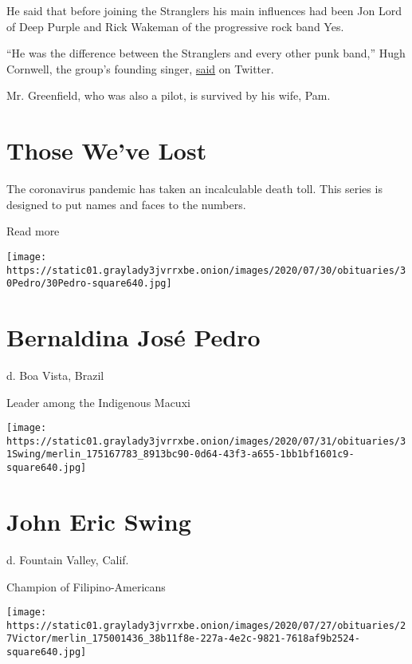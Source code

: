 He said that before joining the Stranglers his main influences had been
Jon Lord of Deep Purple and Rick Wakeman of the progressive rock band
Yes.

``He was the difference between the Stranglers and every other punk
band,'' Hugh Cornwell, the group's founding singer,
\href{https://twitter.com/HughCornwell/status/1257349295742779392?s=20}{said}
on Twitter.

Mr. Greenfield, who was also a pilot, is survived by his wife, Pam.

\href{https://www.nytimes3xbfgragh.onion/interactive/2020/obituaries/people-died-coronavirus-obituaries.html?action=click\&pgtype=Article\&state=default\&region=BELOW_MAIN_CONTENT\&context=covid_obits_promo}{}

\hypertarget{those-weve-lost}{%
\section{Those We've Lost}\label{those-weve-lost}}

The coronavirus pandemic has taken an incalculable death toll. This
series is designed to put names and faces to the numbers.

Read more

\texttt{[image: https://static01.graylady3jvrrxbe.onion/images/2020/07/30/obituaries/30Pedro/30Pedro-square640.jpg]}

\hypertarget{bernaldina-josuxe9-pedro}{%
\section{Bernaldina José Pedro}\label{bernaldina-josuxe9-pedro}}

d. Boa Vista, Brazil

Leader among the Indigenous Macuxi

\texttt{[image: https://static01.graylady3jvrrxbe.onion/images/2020/07/31/obituaries/31Swing/merlin\_175167783\_8913bc90-0d64-43f3-a655-1bb1bf1601c9-square640.jpg]}

\hypertarget{john-eric-swing}{%
\section{John Eric Swing}\label{john-eric-swing}}

d. Fountain Valley, Calif.

Champion of Filipino-Americans

\texttt{[image: https://static01.graylady3jvrrxbe.onion/images/2020/07/27/obituaries/27Victor/merlin\_175001436\_38b11f8e-227a-4e2c-9821-7618af9b2524-square640.jpg]}

